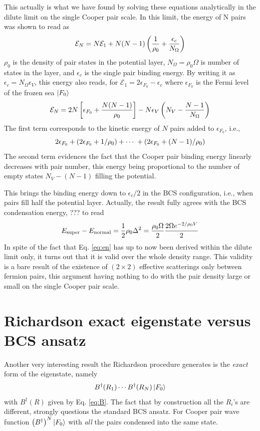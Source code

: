 \documentclass[aps,prb,amsmath,amssymb,preprint,superscriptaddress]{revtex4-1}
\newcommand{\efo}{\epsilon_{F_0}}
\newcommand{\fo}{\ensuremath{\ket{F_0}}}
\renewcommand{\E}{\ensuremath{\mathcal{E}}}
\begin{document}
This actually is what we have found by solving these equations analytically in the dilute limit on the single Cooper pair scale.   In this limit, the energy of N pairs was shown to read as 
\begin{equation}\label{eq:en}
\E_N=N\E_1+N(N-1)\br{\nth{\rho_0}+\frac{\epsilon_c}{N_\Omega}}
\end{equation}
$\rho_0$ is the density of pair states in the potential layer, $N_\Omega=\rho_0\Omega$ is number of states in the layer, and $\epsilon_c$ is the single pair binding energy.  By writing it as $\epsilon_c=N_\Omega\epsilon_V$, this energy also reads, for $\E_1=2\epsilon_{F_0}-\epsilon_c$ where $\epsilon_{F_0}$ is the Fermi level of the frozen sea \fo
\begin{equation}
\E_N=2N\mbr{\epsilon_{F_0}+\frac{N(N-1)}{\rho_0}}-N\epsilon_V\br{N_V-\frac{N-1}{N_\Omega}}
\end{equation}
The first term corresponds to the kinetic energy of $N$ pairs added to $\epsilon_{F_0}$, i.e., 
\begin{equation}
2\efo+\br{2\efo+1/\rho_0}+\cdots\;+\br{2\efo+(N-1)/\rho_0}
\end{equation}
The second term evidences the fact that the Cooper pair binding energy linearly decreases with pair number, this energy being proportional to the number of empty states $N_V-(N-1)$ filling the potential.  

This brings the binding energy down to $\epsilon_c/2$ in the BCS configuration, i.e., when pairs fill half the potential layer. Actually, the result  fully agrees with the BCS condensation energy, ??? to read
\begin{equation}
E_{\text{super}}-E_\text{normal}=\frac{1}{2}\rho_0\Delta^2=\frac{\rho_0\Omega}{2}\frac{2\Omega{e^{-2/\rho_0V}}}{2}
\end{equation}
In spite of the fact that Eq. \eqref{eq:en} has up to now been derived within the dilute limit only, it turns out that it is valid over the whole density range.  This validity is a bare result of the existence of $(2\times2)$ effective scatterings only between fermion pairs, this argument having nothing to do with the pair density large or small on the single Cooper pair scale. 

\section{Richardson exact eigenstate versus BCS ansatz \label{sec:conn}}
Another very interesting result the Richardson procedure generates is the \emph{exact} form of the eigenstate, namely
\begin{equation}
B^{\dagger}(R_1)\cdots{}B^{\dagger}(R_N)\fo
\end{equation}
with $B^{\dagger}(R)$ given by Eq. \eqref{eq:B}.  The fact that by construction all the $R_i$'s are different, strongly questions the standard BCS ansatz. For Cooper pair wave function $\br{B^{\dagger}}^N\fo$ with \emph{all} the pairs condensed into the same state. 
\end{document}
